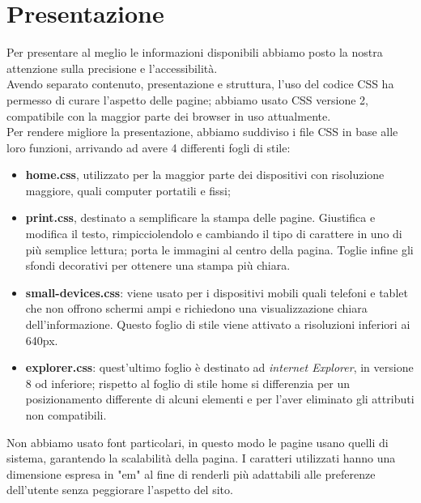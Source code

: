 \section{Presentazione}{
	Per presentare al meglio le informazioni disponibili abbiamo posto la nostra attenzione sulla precisione e l'accessibilità.\\
	Avendo separato contenuto, presentazione e struttura, l'uso del codice CSS ha permesso di curare l'aspetto delle pagine; abbiamo usato CSS versione 2, compatibile con la maggior parte dei browser in uso attualmente.\\
	Per rendere migliore la presentazione, abbiamo suddiviso i file CSS in base alle loro funzioni, arrivando ad avere 4 differenti fogli di stile:
	\begin{itemize}
		\item \textbf{home.css}, utilizzato per la maggior parte dei dispositivi con risoluzione maggiore, quali computer portatili e fissi;
		\item \textbf{print.css}, destinato a semplificare la stampa delle pagine.
		Giustifica e modifica il testo, rimpicciolendolo e cambiando il tipo di carattere in uno di più semplice lettura; porta le immagini al centro della pagina. Toglie infine gli sfondi decorativi per ottenere una stampa più chiara.
		\item \textbf{small-devices.css}: viene usato per i dispositivi mobili quali telefoni e tablet che non offrono schermi ampi e richiedono 
		una visualizzazione chiara dell'informazione. Questo foglio di stile viene attivato a risoluzioni inferiori ai 640px.
		\item \textbf{explorer.css}: quest'ultimo foglio è destinato ad \textit{internet Explorer}, in versione 8 od inferiore; rispetto al foglio di stile home si differenzia per un posizionamento differente di alcuni elementi e per l'aver eliminato gli attributi non compatibili.
	\end{itemize}
	Non abbiamo usato font particolari, in questo modo le pagine usano quelli di sistema, garantendo la scalabilità della pagina. I caratteri utilizzati hanno una dimensione espresa in "em" al fine di renderli più adattabili alle preferenze dell'utente senza peggiorare l'aspetto del sito.
}